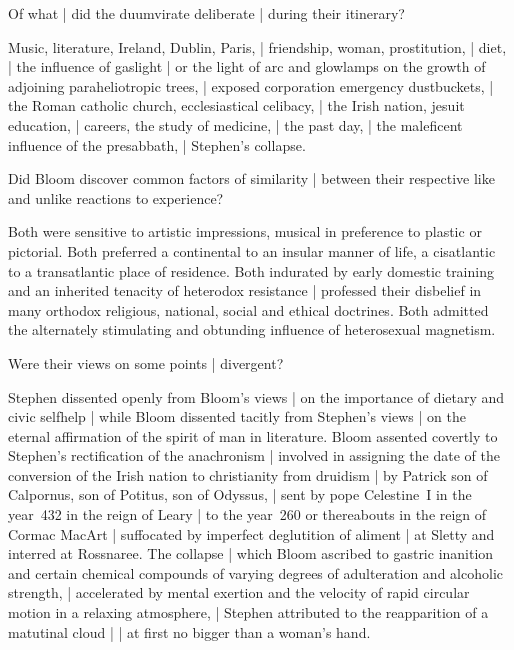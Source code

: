 Of what |
did the duumvirate deliberate |
during their itinerary?

\Factual
Music, literature,
Ireland, Dublin, Paris, |
friendship,
woman, prostitution, |
diet, |
the influence of gaslight |
or the light of arc and glowlamps on the growth of adjoining paraheliotropic trees, |
exposed corporation emergency dustbuckets, |
the Roman catholic church, ecclesiastical celibacy, |
the Irish nation, jesuit education, |
careers, the study of medicine, |
the past day, |
the maleficent influence of the presabbath, |
Stephen's collapse.

Did Bloom discover common factors of similarity |
between their respective like and unlike reactions to experience?

\Philosophy
Both were sensitive to artistic impressions,
musical in preference to plastic or pictorial.
Both preferred a continental to an insular manner of life,
a cisatlantic to a transatlantic place of residence.
Both indurated by early domestic training
and an inherited tenacity of heterodox resistance |
professed their disbelief
in many orthodox religious, national, social and ethical doctrines.
Both admitted the alternately stimulating and obtunding influence
of heterosexual magnetism.


Were their views on some points |
divergent?

\Factual
Stephen dissented openly from Bloom's views |
on the importance of dietary and civic selfhelp |
while Bloom dissented tacitly from Stephen's views |
on the eternal affirmation of the spirit of man in literature.
Bloom assented covertly to Stephen's
rectification of the anachronism |
involved in assigning the date of the conversion of the Irish nation
to christianity from druidism |
by Patrick son of Calpornus, son of Potitus, son of Odyssus, |
sent by pope Celestine~I in the year~432 in the reign of Leary |
to the year~260 or thereabouts in the reign of Cormac MacArt
 |
suffocated by imperfect deglutition of aliment |
at Sletty and interred at Rossnaree.
The collapse |
which Bloom ascribed to gastric inanition and
certain chemical compounds of varying degrees of adulteration and alcoholic strength, |
accelerated by mental exertion
and the velocity of rapid circular motion in a relaxing atmosphere, |
Stephen attributed to the reapparition of a matutinal cloud |
 |
at first no bigger than a woman's hand.


